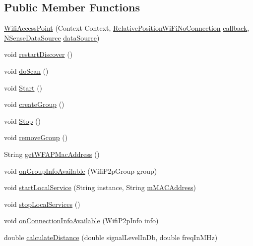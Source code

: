 \subsection*{Public Member Functions}
\begin{DoxyCompactItemize}
\item 
\hyperlink{classcs_1_1nsense_1_1location_1_1_wifi_access_point_a0ee358099abc8abbd323ad7bee839fc8}{Wifi\-Access\-Point} (Context Context, \hyperlink{classcs_1_1nsense_1_1location_1_1_relative_position_wi_fi_no_connection}{Relative\-Position\-Wi\-Fi\-No\-Connection} \hyperlink{classcs_1_1nsense_1_1location_1_1_wifi_access_point_aa4ccc9d8d98e71518c3f53c9d58de630}{callback}, \hyperlink{classcs_1_1nsense_1_1db_1_1_n_sense_data_source}{N\-Sense\-Data\-Source} \hyperlink{classcs_1_1nsense_1_1location_1_1_wifi_access_point_aea07181cba10c042b1b9b079b557b342}{data\-Source})
\item 
void \hyperlink{classcs_1_1nsense_1_1location_1_1_wifi_access_point_acaece91ef1e42d8f022ab751af4fe44d}{restart\-Discover} ()
\item 
void \hyperlink{classcs_1_1nsense_1_1location_1_1_wifi_access_point_ae1fbd14f475cdbbf703ba9c21240361c}{do\-Scan} ()
\item 
void \hyperlink{classcs_1_1nsense_1_1location_1_1_wifi_access_point_a0689477e7389ffda9e1474d18a3483ae}{Start} ()
\item 
void \hyperlink{classcs_1_1nsense_1_1location_1_1_wifi_access_point_a94eba54d2824dd2ca5156d78594e6425}{create\-Group} ()
\item 
void \hyperlink{classcs_1_1nsense_1_1location_1_1_wifi_access_point_a22cbc8753e7b82ef49075c8698870d09}{Stop} ()
\item 
void \hyperlink{classcs_1_1nsense_1_1location_1_1_wifi_access_point_a64a3f4598416cc48316477b0b322cc5a}{remove\-Group} ()
\item 
String \hyperlink{classcs_1_1nsense_1_1location_1_1_wifi_access_point_a2e8df21850db4d3118581d316466e10d}{get\-W\-F\-A\-P\-Mac\-Address} ()
\item 
void \hyperlink{classcs_1_1nsense_1_1location_1_1_wifi_access_point_a8f64f4bf52951e5b0fae18bc5e4296e5}{on\-Group\-Info\-Available} (Wifi\-P2p\-Group group)
\item 
void \hyperlink{classcs_1_1nsense_1_1location_1_1_wifi_access_point_afec3dd77aab907b79d47b80cc1e2df53}{start\-Local\-Service} (String instance, String \hyperlink{classcs_1_1nsense_1_1location_1_1_wifi_access_point_ac9e567df7f55043b5d1a60ecc7de4be9}{m\-M\-A\-C\-Address})
\item 
void \hyperlink{classcs_1_1nsense_1_1location_1_1_wifi_access_point_a2e1960b2419ca99031748023ffcb5c09}{stop\-Local\-Services} ()
\item 
void \hyperlink{classcs_1_1nsense_1_1location_1_1_wifi_access_point_afe3de53a52e8151023ff32568cf789c1}{on\-Connection\-Info\-Available} (Wifi\-P2p\-Info info)
\item 
double \hyperlink{classcs_1_1nsense_1_1location_1_1_wifi_access_point_ae68679631079a7b64352198d27586182}{calculate\-Distance} (double signal\-Level\-In\-Db, double freq\-In\-M\-Hz)
\end{DoxyCompactItemize}
